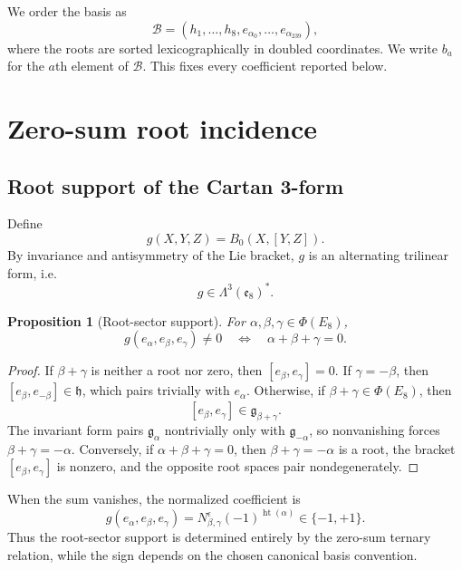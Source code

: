 \documentclass[11pt]{article}
\newtheorem{proposition}[theorem]{Proposition}
\theoremstyle{definition}
\theoremstyle{remark}
\newcommand{\e}{\mathfrak e}
\newcommand{\h}{\mathfrak h}
\newcommand{\PhiE}{\Phi(E_8)}
\begin{document}
We order the basis as
\begin{equation}\label{eq:basisorder}
\mathcal B=(h_1,\ldots,h_8,e_{\alpha_0},\ldots,e_{\alpha_{239}}),
\end{equation}
where the roots are sorted lexicographically in doubled coordinates.  We write $b_a$ for the $a$th element of $\mathcal B$.  This fixes every coefficient reported below.

\section{Zero-sum root incidence}\label{sec:incidence}

\subsection{Root support of the Cartan 3-form}

Define
\begin{equation}\label{eq:gdef}
g(X,Y,Z)=B_0(X,[Y,Z]).
\end{equation}
By invariance and antisymmetry of the Lie bracket, $g$ is an alternating trilinear form, i.e.
\[
g\in\Lambda^3(\e_8)^*.
\]

\begin{proposition}[Root-sector support]\label{prop:rootsupport}
For $\alpha,\beta,\gamma\in\PhiE$,
\[
g(e_\alpha,e_\beta,e_\gamma)\neq0
\quad\Longleftrightarrow\quad
\alpha+\beta+\gamma=0.
\]
\end{proposition}

\begin{proof}
If $\beta+\gamma$ is neither a root nor zero, then $[e_\beta,e_\gamma]=0$.  If $\gamma=-\beta$, then $[e_\beta,e_{-\beta}]\in\h$, which pairs trivially with $e_\alpha$.  Otherwise, if $\beta+\gamma\in\PhiE$, then
\[
[e_\beta,e_\gamma]\in\mathfrak g_{\beta+\gamma}.
\]
The invariant form pairs $\mathfrak g_\alpha$ nontrivially only with $\mathfrak g_{-\alpha}$, so nonvanishing forces $\beta+\gamma=-\alpha$.  Conversely, if $\alpha+\beta+\gamma=0$, then $\beta+\gamma=-\alpha$ is a root, the bracket $[e_\beta,e_\gamma]$ is nonzero, and the opposite root spaces pair nondegenerately.
\end{proof}

When the sum vanishes, the normalized coefficient is
\begin{equation}\label{eq:rrrcoeff}
g(e_\alpha,e_\beta,e_\gamma)
=N_{\beta,\gamma}^{\epsilon}(-1)^{\operatorname{ht}(\alpha)}\in\{-1,+1\}.
\end{equation}
Thus the root-sector support is determined entirely by the zero-sum ternary relation, while the sign depends on the chosen canonical basis convention.
\end{document}
